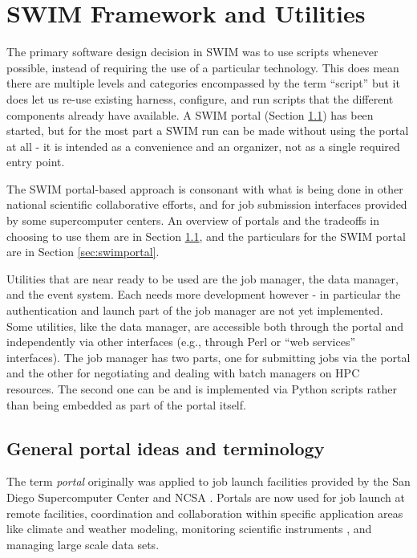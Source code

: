 \section{SWIM Framework and Utilities}
\label{sec:frameworkutils}
The primary software design decision in SWIM was to use scripts whenever
possible, instead of requiring the use of a particular technology. This does
mean there are multiple levels and categories encompassed by the term ``script''
but it does let us re-use existing harness, configure, and run scripts that
the different components already have available. A SWIM portal (Section
\ref{sec:portalgeneral}) has been started, but for the most part a SWIM run can
be made without using the portal at all - it is intended as a convenience and
an organizer, not as a single required entry point.

The SWIM portal-based approach is consonant with what is being
done in other national scientific collaborative efforts, and for job submission
interfaces provided by some supercomputer centers. 
An overview of portals and the tradeoffs in choosing to use them 
are in Section \ref{sec:portalgeneral}, and the particulars for the SWIM portal
are in Section \ref{sec:swimportal}.

Utilities that are near ready to be used are the job manager, the
data manager, and the event system.  Each needs more development however - in
particular the authentication and launch part of the job manager are not
yet implemented.
Some utilities, like the data manager, are accessible both through the portal
and independently via other interfaces (e.g., through Perl or ``web services''
interfaces). The job manager has two parts, one for submitting jobs via the
portal and the other for negotiating and dealing with batch managers on HPC
resources. The second one can be and is implemented via Python scripts rather
than being embedded as part of the portal itself. 







\subsection{General portal ideas and terminology}
\label{sec:portalgeneral} 
The term {\em portal} originally was applied to job launch facilities provided
by the San Diego Supercomputer Center and NCSA \cite{mcat,hdf}. Portals are now used for 
job launch at remote facilities, coordination and collaboration within specific
application areas like climate \cite{climate_portal} and weather
\cite{lead} modeling, monitoring scientific
instruments \cite{cima}, and managing large scale data sets.

